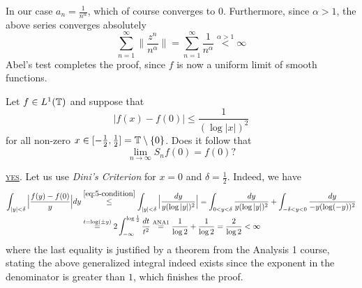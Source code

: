 \documentclass[a4paper, 12pt]{article}
\begin{document}
\begin{Exercise}
    In our case $a_n = \frac{1}{n^\alpha}$, which of course converges to $0$.
    Furthermore, since $\alpha > 1$, the above series converges absolutely
    \[
        \sum_{n = 1}^{\infty} \Big\| \frac{z^n}{n^\alpha} \Big\|
        = \sum_{n = 1}^{\infty} \frac{1}{n^\alpha}
        \overset{\alpha > 1}{<} \infty
    \]
    Abel's test completes the proof, since $f$ is now a uniform limit of smooth
    functions.
\end{Exercise}



\begin{Exercise}
    Let $f \in L^1(\mathbb{T})$ and suppose that
    \begin{equation}
        |f(x) - f(0)| \leq \frac{1}{(\log|x|)^2}
        \label{eq:5-condition}
    \end{equation}
    for all non-zero $x \in [-\frac{1}{2}, \frac{1}{2}] = \mathbb{T}\setminus\left\{ 0 \right\}$.
    Does it follow that
    \[
        \lim_{n \to \infty}S_nf(0) = f(0)?
    \]
    
    \underline{\textsc{yes}}.
    Let us use \emph{Dini's Criterion} for $x = 0$ and $\delta = \frac{1}{2}$.
    Indeed, we have
    \begin{align*}
        \int_{|y|<\delta} \Big|\frac{f(y)-f(0)}{y}\Big|dy
        &\overset{\eqref{eq:5-condition}}{\leq} \int_{|y|<\delta} \Big|\frac{dy}{y(\log|y|)^2}\Big|
        = \int_{0<y<\delta}\frac{dy}{y(\log|y|)^2} + \int_{-\delta<y<0}\frac{dy}{-y(\log(-y))^2} \\
        &\overset{t=\log(\pm y)}{=} 2 \int_{-\infty}^{\log\frac{1}{2}} \frac{dt}{t^2}
        \overset{\text{ANA1}}{=} \frac{1}{\log 2} + \frac{1}{\log 2} = \frac{2}{\log 2} < \infty
    \end{align*}
    where the last equality is justified by a theorem from the Analysis 1
    course, stating the above generalized integral indeed exists since the
    exponent in the denominator is greater than $1$, which finishes the proof.
\end{Exercise}
\end{document}
